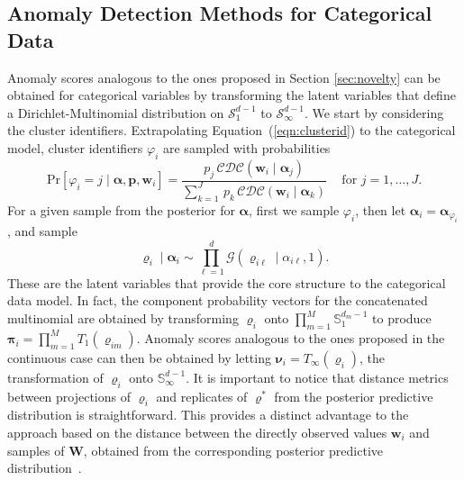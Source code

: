 \subsection{Anomaly Detection Methods for Categorical Data\label{subsec:catscores}}
Anomaly scores analogous to the ones proposed in Section \ref{sec:novelty} can be 
obtained for categorical variables by transforming the latent variables that define
a Dirichlet-Multinomial distribution on $\mathcal{S}_1^{d-1}$ to $\mathcal{S}_\infty^{d-1}$. 
We start by considering the cluster identifiers. Extrapolating Equation~(\ref{eqn:clusterid})
    to the categorical model, cluster identifiers $\varphi_i$ are sampled with probabilities
    \begin{equation}
        \label{eqn:latentposterior}
        \text{Pr}[\varphi_i = j\mid \bm{\alpha}, \bm{p}, \bm{w}_i] = \frac{p_j\,\mathcal{CDC}\left(\bm{w}_i\mid\bm{\alpha}_j\right)}{\sum_{k = 1}^J\,p_k\,\mathcal{CDC}\left(\bm{w}_i\mid\bm{\alpha}_k\right)}
            \;\;\;\text{ for }j = 1, \ldots, J.
    \end{equation}
    For a given sample from the posterior for $\bm{\alpha}$,
    first we sample $\varphi_i$, then let $\bm{\alpha}_i = \bm{\alpha}_{\varphi_i}$, and
    sample
    \begin{equation}
        \label{eqn:postpredrho}
        \bm{\varrho}_i\mid\bm{\alpha}_i \sim 
        \prod_{\ell = 1}^d\mathcal{G}\left(\varrho_{i\ell}\mid\alpha_{i\ell}, 1\right).
    \end{equation}
    These are the latent variables that provide the core structure to the categorical
    data model. In fact, the component probability vectors for the concatenated multinomial
    are obtained by transforming $\bm{\varrho}_i$ onto $\prod_{m = 1}^M\mathbb{S}_1^{{d_m}-1}$
    to produce $\bm{\pi}_i = \prod_{m=1}^{M}T_1(\bm{\varrho}_{im})$. Anomaly scores
    analogous to the ones proposed in the continuous case can then be obtained by
    letting $\bm{\nu}_i = T_{\infty}(\bm{\varrho}_i)$, the transformation of $\bm{\varrho}_i$ 
    onto $\mathbb{S}_{\infty}^{d-1}$.
    It is important to notice that distance metrics 
    between projections of $\bm{\varrho}_i$ and  replicates of $\bm{\varrho}^*$ 
    from the posterior predictive distribution is straightforward. This provides
    a distinct advantage to the approach based on the distance between the 
    directly observed values $\bm{w}_i$ and samples of $\bm{W}$, obtained 
    from the corresponding posterior predictive distribution~\citep{Alamuri2014}. 
    
